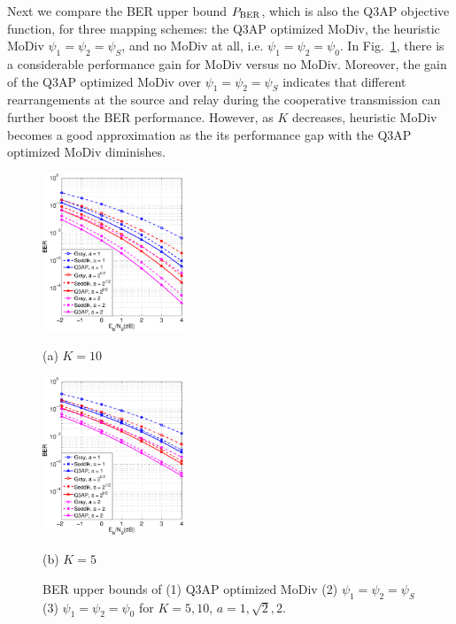 \documentclass[journal]{IEEEtran}
\newcommand{\BER}{\rm{BER}}
\begin{document}
Next we compare the BER upper bound $P_{\BER}$, which is also the Q3AP objective
function, for three mapping schemes: the Q3AP optimized MoDiv, the heuristic
MoDiv $\psi_1 = \psi_2 = \psi_S$, and no MoDiv at all, i.e. $\psi_1 = \psi_2 =
\psi_0$. In Fig.~\ref{fig:BERupperbound}, there is a considerable performance
gain for MoDiv versus no MoDiv. Moreover, the gain of the Q3AP optimized MoDiv
over $\psi_1 = \psi_2 = \psi_S$ indicates that different rearrangements at the
source and relay during the cooperative transmission can further boost the BER
performance. However, as $K$ decreases, heuristic MoDiv becomes a good
approximation as the its performance gap with the Q3AP optimized MoDiv
diminishes.

\begin{figure}[!t]
    \begin{minipage}[b]{0.49\linewidth}
      \centering
      \centerline{\includegraphics[width=4.2cm]{./figs/bound_10.eps}}
      \centerline{(a) $ K = 10$}\medskip
    \end{minipage}
    \hfill
    \begin{minipage}[b]{0.49\linewidth}
      \centering
      \centerline{\includegraphics[width=4.2cm]{./figs/bound_5.eps}}
      \centerline{(b) $K=5$}\medskip
    \end{minipage}
    \caption{BER upper bounds of (1) Q3AP optimized MoDiv (2) $\psi_1 = \psi_2 =
    \psi_S$ (3) $\psi_1 = \psi_2 = \psi_0$ for $K = 5, 10$, $a = 1, \sqrt{2},
    2$.}
    \label{fig:BERupperbound}
\end{figure}
\end{document}
